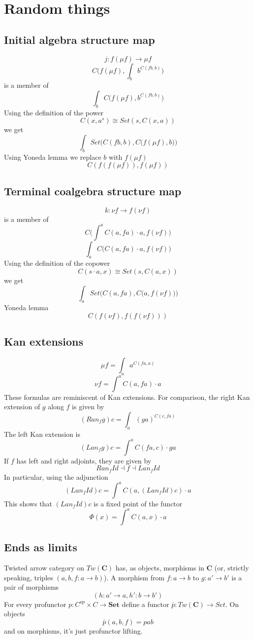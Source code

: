 \documentclass[11pt]{amsart}
\newcommand{\Cat}[1]{\mathbf{#1}}
\begin{document}
\section{Random things}
\subsection{Initial algebra structure map}
\[j \colon f (\mu f) \to \mu f\]
\[C\Big(f (\mu f), \int_b b^{C(f b, b)}\Big)\]
is a member of
\[\int_b C\Big(f (\mu f), b^{C(f b, b)}\Big)\]
Using the definition of the power
\[ C(x, a^s) \cong Set(s, C(x, a)) \]
we get
\[\int_b Set\Big(C(f b, b), C\big( f (\mu f), b\big) \Big)\]
Using Yoneda lemma we replace $b$ with $f (\mu f)$
\[C(f (f (\mu f)), f (\mu f)) \]

\subsection{Terminal coalgebra structure map}
\[k \colon \nu f \to f (\nu f)\]
is a member of
\[ C\Big( \int^a C(a, f a) \cdot a, f  (\nu f) \Big)\]
\[ \int_a C\Big( C(a, f a) \cdot a, f  (\nu f) \Big)\]
Using the definition of the copower
\[ C(s \cdot a, x) \cong Set(s, C(a, x))\]
we get
\[ \int_a Set\Big( C(a, f a), C\big( a, f  (\nu f) \big) \Big)\]
Yoneda lemma
\[ C(f(\nu f), f ( f (\nu f))) \]

\subsection{Kan extensions}
\[\mu f = \int_a a^{C(f a, a)}\]
\[\nu f = \int^a C(a, f a) \cdot a \]
These formulas are reminiscent of Kan extensions. 
For comparison, the right  Kan extension of $g$ along $f$ is given by
\[(Ran_f g) c = \int_a (g a)^{C(c, f a)}\]
The left Kan extension is
\[(Lan_f g) c = \int^a C(f a, c) \cdot g a \]
If $f$ has left and right adjoints, they are given by
\[Ran_f Id \dashv f \dashv Lan_f Id\]
In particular, using the adjunction
\[(Lan_f Id) c = \int^a C(a, (Lan_f Id) c) \cdot a\]
This shows that $(Lan_f Id) c$ is a fixed point of the functor
\[ \Phi(x) = \int^a C(a, x) \cdot a \]

\subsection{Ends as limits}

Twisted arrow category on $\textit{Tw}(\Cat C)$ has, as objects, morphisms in $\Cat C$ (or, strictly speaking, triples $(a, b, f \colon a \to b)$). A morphism from $f \colon a \to b$ to $g \colon a' \to b'$ is a pair of morphisms 
\[(h \colon a' \to a, h' \colon b \to b')\]
For every profunctor $p \colon C^{op} \times C \to \Cat{Set}$ define a functor $\bar p \colon \textit{Tw}(\Cat C) \to Set$. On objects
\[\bar p (a, b, f) = p a b\]
and on morphisms, it's just profunctor lifting.
\end{document}
